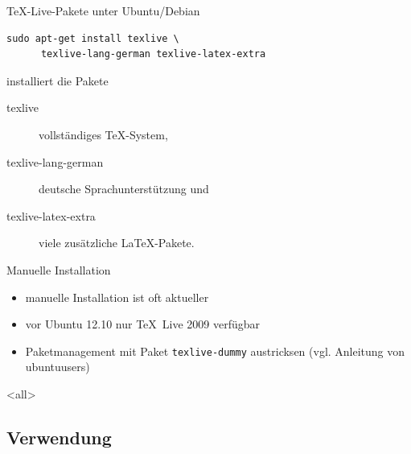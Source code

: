 \begin{Frame}[fragile]{\TeX-Live-Pakete unter Ubuntu/Debian}
  \begin{lstlisting}[gobble=4,language={},morekeywords={sudo,apt,get}]
    sudo apt-get install texlive \
      texlive-lang-german texlive-latex-extra
  \end{lstlisting}

  installiert die Pakete

  \begin{description}
    \item[texlive] vollständiges \TeX-System, 
    \item[texlive-lang-german] deutsche Sprachunterstützung und
    \item[texlive-latex-extra] viele zusätzliche \LaTeX-Pakete.
  \end{description}

  \begin{alertblock}{Manuelle Installation}
    \begin{itemize}
      \item manuelle Installation ist oft aktueller
      \item vor Ubuntu 12.10 nur \TeX\ Live 2009 verfügbar
      \item Paketmanagement mit Paket \texttt{texlive-dummy} austricksen
        (vgl. Anleitung von ubuntuusers)
    \end{itemize}
  \end{alertblock}
\end{Frame}

\mode
<all>


\subsection{Verwendung}


